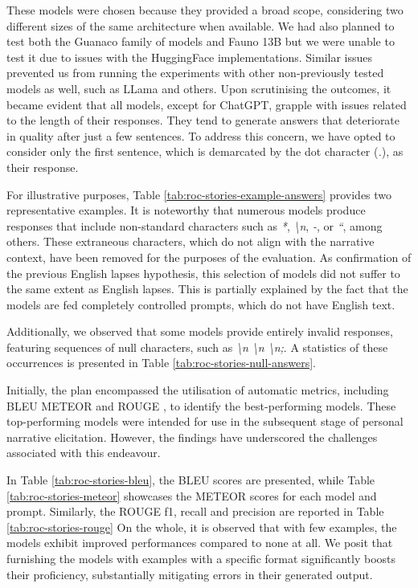 These models were chosen because they provided a broad scope, considering two different sizes of the same architecture when available. We had also planned to test both the Guanaco family of models and Fauno 13B but we were unable to test it due to issues with the HuggingFace implementations. Similar issues prevented us from running the experiments with other non-previously tested models as well, such as LLama and others.
\label{cha:methodology-LLMs-selection-story-cloze-test-results}
Upon scrutinising the outcomes, it became evident that all models, except for ChatGPT, grapple with issues related to the length of their responses. They tend to generate answers that deteriorate in quality after just a few sentences. To address this concern, we have opted to consider only the first sentence, which is demarcated by the dot character (\emph{.}), as their response.

For illustrative purposes, Table \ref{tab:roc-stories-example-answers} provides two representative examples. It is noteworthy that numerous models produce responses that include non-standard characters such as \emph{*}, \emph{\textbackslash n}, \emph{-}, or \emph{``}, among others. These extraneous characters, which do not align with the narrative context, have been removed for the purposes of the evaluation. 
As confirmation of the previous English lapses hypothesis, this selection of models did not suffer to the same extent as English lapses. This is partially explained by the fact that the models are fed completely controlled prompts, which do not have English text. 


Additionally, we observed that some models provide entirely invalid responses, featuring sequences of null characters, such as \emph{\textbackslash n \textbackslash n \textbackslash n;}. A statistics of these occurrences is presented in Table \ref{tab:roc-stories-null-answers}.

Initially, the plan encompassed the utilisation of automatic metrics, including BLEU \cite{bleu} METEOR \cite{meteor} and ROUGE \cite{rouge}, to identify the best-performing models. These top-performing models were intended for use in the subsequent stage of personal narrative elicitation. However, the findings have underscored the challenges associated with this endeavour.



In Table \ref{tab:roc-stories-bleu}, the BLEU scores are presented, while Table \ref{tab:roc-stories-meteor} showcases the METEOR scores for each model and prompt. Similarly, the ROUGE f1, recall and precision are reported in Table \ref{tab:roc-stories-rouge} On the whole, it is observed that with few examples, the models exhibit improved performances compared to none at all. We posit that furnishing the models with examples with a specific format significantly boosts their proficiency, substantially mitigating errors in their generated output.

